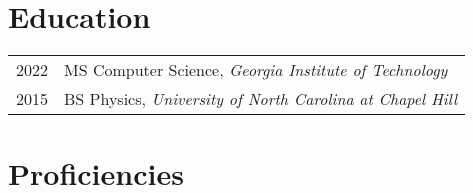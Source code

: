 \documentclass[a4paper, 9pt]{article} %
\begin{document}
\vspace{-10pt}
\section{Education}

\begin{tabular}{ll}	
2022 & MS Computer Science, \emph{Georgia Institute of Technology}\\
2015 & BS Physics, \emph{University of North Carolina at Chapel Hill}\\




\end{tabular}
\bigskip

\vspace{-7pt}
\section{Proficiencies}
\end{document}
